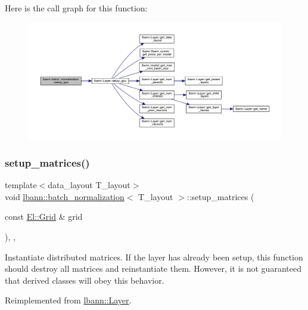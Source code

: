 Here is the call graph for this function\+:\nopagebreak
\begin{figure}[H]
\begin{center}
\leavevmode
\includegraphics[width=350pt]{classlbann_1_1batch__normalization_ab4737c3efcafa9bff1e68084b7f36283_cgraph}
\end{center}
\end{figure}
\mbox{\label{classlbann_1_1batch__normalization_a4ddf27efaf48f0726dc4356a3a0b40a9}} 
\subsubsection{\texorpdfstring{setup\+\_\+matrices()}{setup\_matrices()}}
{\footnotesize\ttfamily template$<$data\+\_\+layout T\+\_\+layout$>$ \\
void \hyperlink{classlbann_1_1batch__normalization}{lbann\+::batch\+\_\+normalization}$<$ T\+\_\+layout $>$\+::setup\+\_\+matrices (\begin{DoxyParamCaption}\item[{const \hyperlink{base_8hpp_a9951bb1719d534e0401b1f06cad19eab}{El\+::\+Grid} \&}]{grid }\end{DoxyParamCaption})\hspace{0.3cm}{\ttfamily [inline]}, {\ttfamily [override]}, {\ttfamily [virtual]}}

Instantiate distributed matrices. If the layer has already been setup, this function should destroy all matrices and reinstantiate them. However, it is not guaranteed that derived classes will obey this behavior. 

Reimplemented from \hyperlink{classlbann_1_1Layer_a57bbe21131dc00ab5cf9ea5e3656808e}{lbann\+::\+Layer}.



